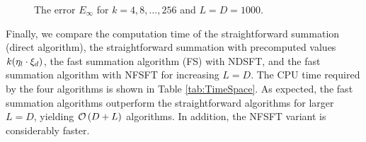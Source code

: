 \begin{figure}[tb]
  \centering
  \hfill
  \caption{The error $E_{\infty}$ for $k = 4,8,\ldots,256$ and $L = D = 1000$.}
  \label{Figure:PoissonTest}
\end{figure}

Finally, we compare the computation time of the straightforward summation 
(direct algorithm), the straightforward summation with precomputed values 
$k{\hspace{-0.4ex}}\left(\mathbf{\eta}_{l} \cdot \mathbf{\xi}_{d}\right)$, the fast summation algorithm (FS) 
with NDSFT, and the fast summation algorithm with NFSFT for increasing $L=D$.
The CPU time required by the four algorithms is shown in Table 
\ref{tab:TimeSpace}. As expected, the fast summation algorithms outperform the
straightforward algorithms for larger $L=D$, yielding $\mathcal{O}\left(D + L\right)$ 
algorithms. In addition, the NFSFT variant is considerably faster.

